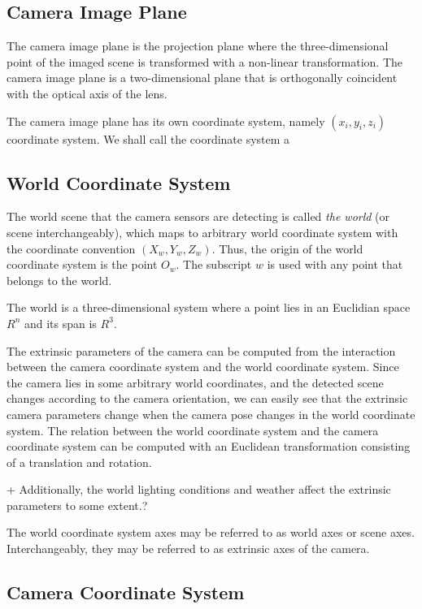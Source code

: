 \documentclass[12pt,a4paper,oneside,pdftex]{report}
\begin{document}
\subsection{Camera Image Plane}

The camera image plane is the projection plane where the three-dimensional point of the imaged scene is transformed with a non-linear transformation. The camera image plane is a two-dimensional plane that is orthogonally coincident with the optical axis of the lens. 

The camera image plane has its own coordinate system, namely $(x_i,y_i,z_i)$ coordinate system. We shall call the coordinate system a 

\subsection{World Coordinate System}

The world scene that the camera sensors are detecting is called \emph{the world} (or scene interchangeably), which maps to arbitrary world coordinate system with the coordinate convention $(X_w, Y_w, Z_w)$. Thus, the origin of the world coordinate system is the point $O_w$. The subscript $w$ is used with any point that belongs to the world.

The world is a three-dimensional system where a point lies in an Euclidian space $R^n$ and its span is $R^3$.

The extrinsic parameters of the camera can be computed from the interaction between the camera coordinate system and the world coordinate system. Since the camera lies in some arbitrary world coordinates, and the detected scene changes according to the camera orientation, we can easily see that the extrinsic camera parameters change when the camera pose changes in the world coordinate system. The relation between the world coordinate system and the camera coordinate system can be computed with an Euclidean transformation consisting of a translation and rotation. 

+ Additionally, the world lighting conditions and weather affect the extrinsic parameters to some extent.?

The world coordinate system axes may be referred to as world axes or scene axes. Interchangeably, they may be referred to as extrinsic axes of the camera.

\subsection{Camera Coordinate System}
\end{document}
